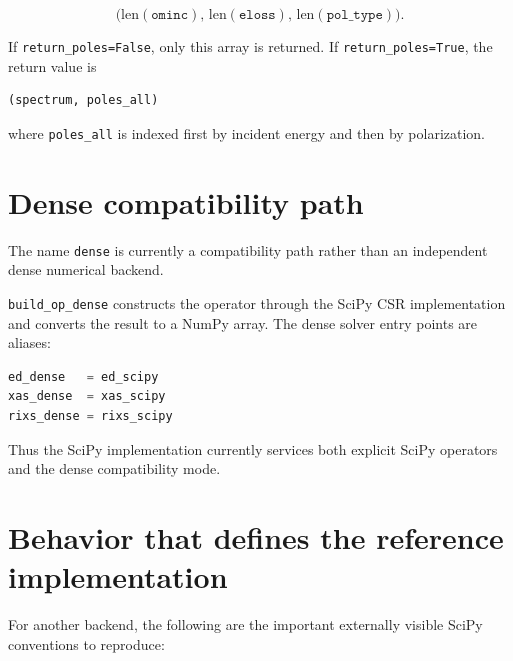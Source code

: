 \documentclass[11pt]{article}
\begin{document}
\begin{equation}
  \bigl(
  \mathrm{len}(\texttt{ominc}),\,
  \mathrm{len}(\texttt{eloss}),\,
  \mathrm{len}(\texttt{pol\_type})
  \bigr).
\end{equation}

If \texttt{return\_poles=False}, only this array is returned.  If \texttt{return\_poles=True}, the return value is

\begin{lstlisting}[language=Python]
(spectrum, poles_all)
\end{lstlisting}

where \texttt{poles\_all} is indexed first by incident energy and then by polarization.

\section{Dense compatibility path}

The name \texttt{dense} is currently a compatibility path rather than an independent dense numerical backend.

\texttt{build\_op\_dense} constructs the operator through the SciPy CSR implementation and converts the result to a NumPy array.  The dense solver entry points are aliases:

\begin{lstlisting}[language=Python]
ed_dense   = ed_scipy
xas_dense  = xas_scipy
rixs_dense = rixs_scipy
\end{lstlisting}

Thus the SciPy implementation currently services both explicit SciPy operators and the dense compatibility mode.

\section{Behavior that defines the reference implementation}

For another backend, the following are the important externally visible SciPy conventions to reproduce:
\end{document}
